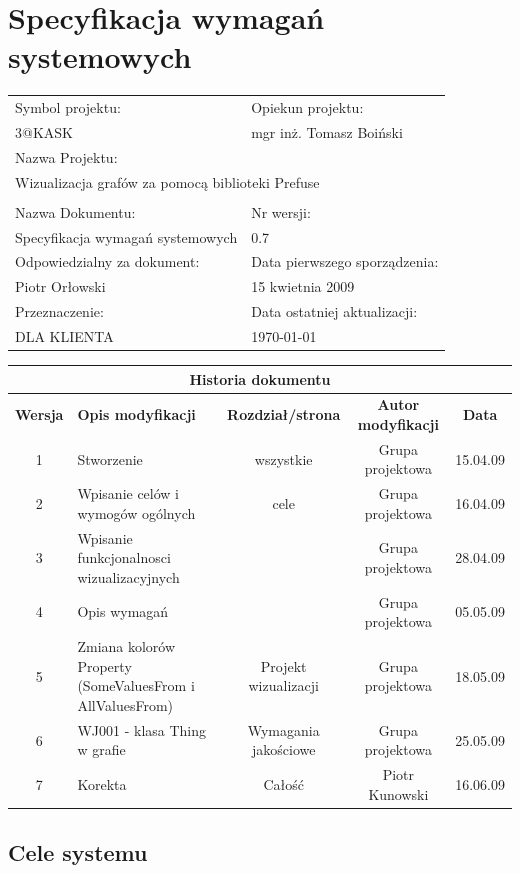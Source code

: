 

\section{Specyfikacja wymagań systemowych}


\begin{center}
\begin{tabular}{|p{7cm}|p{7cm}|}
\hline
Symbol projektu: & Opiekun projektu:   \tabularnewline
3@KASK & mgr inż. Tomasz Boiński    \tabularnewline \hline
\multicolumn{2}{|l|}{Nazwa Projektu: } \tabularnewline
\multicolumn{2}{|l|}{Wizualizacja grafów za pomocą biblioteki Prefuse } \tabularnewline
\hline
\multicolumn{2}{l}{ } \tabularnewline %
\hline
Nazwa Dokumentu: & Nr wersji:   \tabularnewline
Specyfikacja wymagań systemowych & 0.7 \tabularnewline \hline
Odpowiedzialny za dokument: & Data pierwszego sporządzenia:   \tabularnewline
Piotr Orłowski & 15 kwietnia 2009 \tabularnewline \hline
Przeznaczenie: & Data ostatniej aktualizacji:   \tabularnewline
DLA KLIENTA & \today \tabularnewline \hline
\end{tabular}
\end{center}


\begin{center}
\begin{tabular}{|c|p{4cm}|c|c|c|}
\multicolumn{5}{c}{\textbf{Historia dokumentu}} \tabularnewline \hline
\textbf{Wersja} & \textbf{Opis modyfikacji} & \textbf{Rozdział/strona} & \textbf{Autor modyfikacji} & \textbf{Data} \tabularnewline \hline
1 & Stworzenie & wszystkie & Grupa projektowa & 15.04.09 \tabularnewline \hline
2 & Wpisanie celów i wymogów ogólnych  & cele & Grupa projektowa & 16.04.09\tabularnewline \hline
3 & Wpisanie funkcjonalnosci wizualizacyjnych & & Grupa projektowa & 28.04.09\tabularnewline \hline
4 & Opis wymagań & & Grupa projektowa & 05.05.09\tabularnewline \hline
5 & Zmiana kolorów Property (SomeValuesFrom i AllValuesFrom) & Projekt wizualizacji & Grupa projektowa & 18.05.09\tabularnewline \hline
6 & WJ001 - klasa Thing w grafie & Wymagania jakościowe & Grupa projektowa & 25.05.09\tabularnewline \hline
7 & Korekta & Całość & Piotr Kunowski & 16.06.09 \tabularnewline \hline
\end{tabular}
\end{center}




\subsection{Cele systemu}

